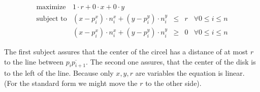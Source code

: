 \documentclass[11pt,a4paper,ngerman]{article}
\begin{document}
\begin{equation}\label{alge:ueb6:disklp}\begin{array}{lrclr}
    \text{maximize} & 1 \cdot r + 0 \cdot x + 0 \cdot y\\
    \text{subject to} & (x-p_i^x) \cdot n_i^x + (y-p_i^y) \cdot n_i^y & \leq & r & \forall 0 \leq i \leq n\\
                & (x - p_i^x) \cdot n_i^x + (y-p_i^y) \cdot n_i^y & \geq & 0 & \forall 0 \leq i \leq n
\end{array}\end{equation}

The first subject assures that the center of the circel has a distance of at most $r$ to the line between $\overline{p_ip_{i+1}}$.
The second one assures, that the center of the disk is to the left of the line.
Because only $x,y,r$ are variables the equation is linear.
(For the standard form we might move the $r$ to the other side).

\label{LastPage}
\end{document}
